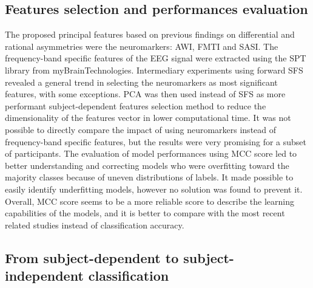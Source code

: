 \subsection{Features selection and performances evaluation}

The proposed principal features based on previous findings on differential and rational asymmetries were the neuromarkers: AWI, FMTI and SASI. The frequency-band specific features of the EEG signal were extracted using the SPT library from myBrainTechnologies. Intermediary experiments using forward SFS revealed a general trend in selecting the neuromarkers as most significant features, with some exceptions. PCA was then used instead of SFS as more performant subject-dependent features selection method to reduce the dimensionality of the features vector in lower computational time. It was not possible to directly compare the impact of using neuromarkers instead of frequency-band specific features, but the results were very promising for a subset of participants. The evaluation of model performances using MCC score led to better understanding and correcting models who were overfitting toward the majority classes because of uneven distributions of labels. It made possible to easily identify underfitting models, however no solution was found to prevent it. Overall, MCC score seems to be a more reliable score to describe the learning capabilities of the models, and it is better to compare with the most recent related studies instead of classification accuracy.

\subsection{From subject-dependent to subject-independent classification}

